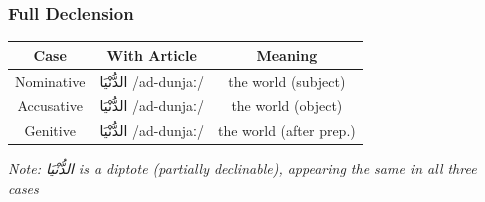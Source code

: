 \documentclass[letterpaper,12pt]{article}
\begin{document}
\subsubsection*{Full Declension}
\begin{tabular}{|c|c|c|}
\hline
\textbf{Case} & \textbf{With Article} & \textbf{Meaning} \\
\hline
Nominative & \textarabic{الدُّنْيَا} /ad-dunjaː/ & the world (subject) \\
\hline
Accusative & \textarabic{الدُّنْيَا} /ad-dunjaː/ & the world (object) \\
\hline
Genitive & \textarabic{الدُّنْيَا} /ad-dunjaː/ & the world (after prep.) \\
\hline
\end{tabular}

\textit{Note: \textarabic{الدُّنْيَا} is a diptote (partially declinable), appearing the same in all three cases}

\end{document}
